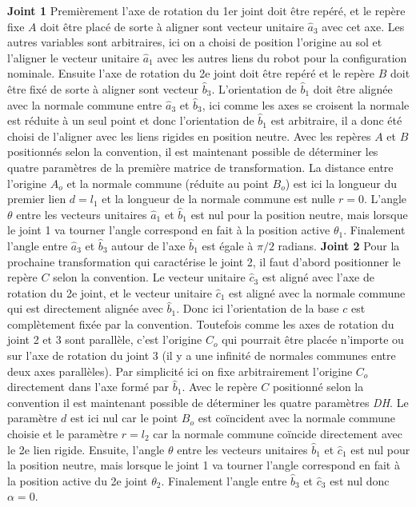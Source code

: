 \begin{example}
\textbf{Joint 1} Premièrement l'axe de rotation du 1er joint doit être repéré, et le repère fixe $A$ doit être placé de sorte à aligner sont vecteur unitaire $\hat{a}_3$ avec cet axe. Les autres variables sont arbitraires, ici on a choisi de position l'origine au sol et l'aligner le vecteur unitaire $\hat{a}_1$ avec les autres liens du robot pour la configuration nominale. Ensuite l'axe de rotation du 2e joint doit être repéré et le repère $B$ doit être fixé de sorte à aligner sont vecteur $\hat{b}_3$. L'orientation de $\hat{b}_1$ doit être alignée avec la normale commune entre $\hat{a}_3$ et $\hat{b}_3$, ici comme les axes se croisent la normale est réduite à un seul point et donc l'orientation de $\hat{b}_1$ est arbitraire, il a donc été choisi de l'aligner avec les liens rigides en position neutre. Avec les repères $A$ et $B$ positionnés selon la convention, il est maintenant possible de déterminer les quatre paramètres de la première matrice de transformation. La distance entre l'origine $A_o$ et la normale commune (réduite au point $B_o$) est ici la longueur du premier lien $d= l_1$ et la longueur de la normale commune est nulle $r = 0$. L'angle $\theta$ entre les vecteurs unitaires $\hat{a}_1$ et $\hat{b}_1$ est nul pour la position neutre, mais lorsque le joint 1 va tourner l'angle correspond en fait à la position active $\theta_1$. Finalement l'angle entre $\hat{a}_3$ et $\hat{b}_3$ autour de l'axe $\hat{b}_1$ est égale à $\pi/2$ radians. 
%
\textbf{Joint 2 } Pour la prochaine transformation qui caractérise le joint 2, il faut d'abord positionner le repère $C$ selon la convention. Le vecteur unitaire $\hat{c}_3$ est aligné avec l'axe de rotation du 2e joint, et le vecteur unitaire $\hat{c}_1$ est aligné avec la normale commune qui est directement alignée avec $\hat{b}_1$. Donc ici l'orientation de la base $c$ est complètement fixée par la convention. Toutefois comme les axes de rotation du joint 2 et 3 sont parallèle, c'est l'origine $C_o$ qui pourrait être placée n'importe ou sur l'axe de rotation du joint 3 (il y a une infinité de normales communes entre deux axes parallèles). Par simplicité ici on fixe arbitrairement l'origine $C_o$ directement dans l'axe formé par $\hat{b}_1$. Avec le repère $C$ positionné selon la convention il est maintenant possible de déterminer les quatre paramètres \textit{DH}. Le paramètre $d$ est ici nul car le point $B_o$ est coïncident avec la normale commune choisie et le paramètre $r=l_2$ car la normale commune coïncide directement avec le 2e lien rigide. Ensuite, l'angle $\theta$ entre les vecteurs unitaires $\hat{b}_1$ et $\hat{c}_1$ est nul pour la position neutre, mais lorsque le joint 1 va tourner l'angle correspond en fait à la position active du 2e joint $\theta_2$. Finalement l'angle entre $\hat{b}_3$ et $\hat{c}_3$ est nul donc $\alpha=0$. 

\end{example}
